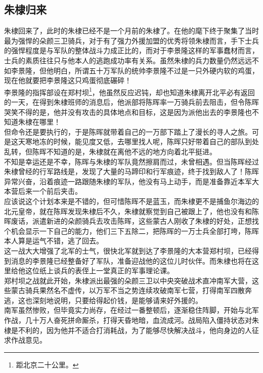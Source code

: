 \begin{multicols}{\theparacolNo}
\subsection{朱棣归来}
朱棣回来了，此时的朱棣已经不是一个月前的朱棣了。在他的麾下终于聚集了当时最为强悍的朵颜三卫骑兵，对于有了强力外援加盟的优秀将领朱棣而言，手下士兵的强悍程度是与军队的整体战斗力成正比的，而对于李景隆这样的军事蠢材而言，士兵的素质往往只与他本人的逃跑成功率有关系。虽然朱棣的兵力数量仍然远远不如李景隆，但他明白，所谓五十万军队的统帅李景隆不过是一只外硬内软的鸡蛋，现在他就要把李景隆这只鸡蛋彻底碾碎！\\

李景隆的指挥部设在郑村坝\footnote{距北京二十公里。}，他虽然反应迟钝，却也知道朱棣离开北平必有返回的一天，在得到朱棣班师的消息后，他派部将陈晖率一万骑兵前去阻击，但令陈晖哭笑不得的是，他并没有攻击的具体地点和目标，这是因为派他出去的李景隆也不知道朱棣在哪里！\\

但命令还是要执行的，于是陈晖就带着自己的一万部下踏上了漫长的寻人之旅。可是这天寒地冻的时候，能见度又低，去哪里找人呢，陈晖只好带着自己的部队到处乱转，但陈晖不知道的是，朱棣就在离他不远的地方向着北平挺进。\\

不知是幸运还是不幸，陈晖与朱棣的军队竟然擦肩而过，未曾相遇。但当陈晖经过朱棣曾经的行军路线是，发现了大量的马蹄印和行军痕迹，终于找到敌人了！陈晖异常兴奋，沿着痕迹一路跟随朱棣的军队，他没有马上动手，而是准备靠近本军大本营后来一个前后夹击。\\

应该说这个计划本来是不错的，但可惜陈晖不是蓝玉，而朱棣更不是捕鱼尔海边的北元皇帝，就在陈晖发现朱棣后不久，朱棣就察觉到自己被跟上了，他也没有和陈晖废话，派遣新进的朵颜骑兵去攻击陈晖，这些蒙古人刚收了朱棣的好处，正想找个机会显示一下自己的能力，他们三下五除二，把陈晖的一万士兵全部打垮，陈晖本人算是运气不错，逃了回去。\\

这一战大大增强了北军的士气，很快北军就到达了李景隆的大本营郑村坝，已经得到消息的李景隆已经整备好了军队，准备迎战他的这位儿时伙伴。而朱棣也将在这里给他这位纸上谈兵的表侄上一堂真正的军事理论课。\\

郑村坝之战就此开始，朱棣派出最强的朵颜三卫以中央突破战术直冲南军大营，这些蒙古骑兵果然名不虚传，以万军不当之势连续攻破南军七营，打得南军四散奔逃，这也深刻地说明，只要给得起价钱，是能够请来好外援的。\\

南军虽然惨败，但毕竟实力尚存，在经过一番整顿后，逐渐稳住阵脚，开始与北军作战，几十万人奋死拼命厮杀，打得天昏地暗，血流成河。战局陷入僵持状态对朱棣是不利的，因为他并不适合打消耗战，为了能够尽快解决战斗，他向身边的人征求作战意见。\\


\end{multicols}
